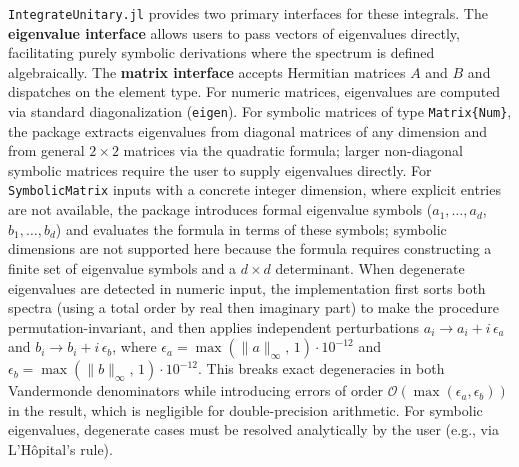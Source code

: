 \documentclass[manuscript,screen]{acmart}
\begin{document}
\texttt{IntegrateUnitary.jl} provides two primary interfaces for these integrals. The
\textbf{eigenvalue interface} allows users to pass vectors of eigenvalues
directly, facilitating purely symbolic derivations where the spectrum is defined
algebraically. The \textbf{matrix interface} accepts Hermitian matrices $A$ and
$B$ and dispatches on the element type. For numeric matrices, eigenvalues are
computed via standard diagonalization (\texttt{eigen}). For symbolic matrices
of type \texttt{Matrix\{Num\}}, the package extracts eigenvalues from diagonal
matrices of any dimension and from general $2 \times 2$ matrices via the
quadratic formula; larger non-diagonal symbolic matrices require the user to
supply eigenvalues directly. For \texttt{SymbolicMatrix} inputs with a concrete integer dimension,
where explicit entries are not available, the package introduces formal
eigenvalue symbols ($a_1, \ldots, a_d$, $b_1, \ldots, b_d$) and evaluates the
formula in terms of these symbols; symbolic dimensions are not supported here
because the formula requires constructing a finite set of eigenvalue symbols and
a $d \times d$ determinant. When degenerate eigenvalues are detected in numeric
input, the implementation first sorts both spectra (using a total order by real
then imaginary part) to make the procedure permutation-invariant, and then
applies independent perturbations
$a_i \to a_i + i\,\epsilon_a$ and $b_i \to b_i + i\,\epsilon_b$, where
$\epsilon_a = \max(\|a\|_\infty,\, 1)\cdot 10^{-12}$ and
$\epsilon_b = \max(\|b\|_\infty,\, 1)\cdot 10^{-12}$. This breaks exact
degeneracies in both Vandermonde denominators while introducing errors of order
$\mathcal{O}(\max(\epsilon_a,\epsilon_b))$ in the result, which is negligible for
double-precision arithmetic. For symbolic eigenvalues, degenerate cases must
be resolved analytically by the user (e.g., via L'H\^{o}pital's rule).
\end{document}
